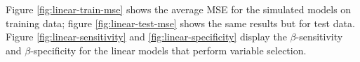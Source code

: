 \documentclass{article}
\begin{document}

	
	Figure \ref{fig:linear-train-mse} shows the average MSE for the simulated models on training data; figure \ref{fig:linear-test-mse} shows the same results but for test data. Figure \ref{fig:linear-sensitivity} and \ref{fig:linear-specificity} display the $\beta$-sensitivity and $\beta$-specificity for the linear models that perform variable selection.
	
\end{document}
